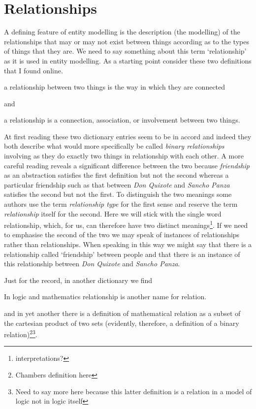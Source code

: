 
\section{Relationships}
\label{Relationships}
\mynote
A defining feature of entity modelling is the description
 (the modelling) of the relationships that may or may not  exist between things according as to the types of things that they are. 
\mynote 
We need to say something about this term `relationship' as it is used in
entity modelling.
As a starting point consider these two definitions that I found online. 

\begin{erquote}
a relationship between two things is the way in which they are connected
\end{erquote}
and 
\begin{erquote}
a relationship is a connection, association, or involvement between two things.
\end{erquote}

At first reading these two dictionary entries seem to be in accord and indeed 
they both describe what would more specifically be called \textit{binary relationships} involving as they do exactly two things in relationship with each other.
A more careful reading reveals a significant difference between the two because \textit{friendship} as an abstraction satisfies the first definition but not the second whereas a particular friendship such as that between \textit{Don Quixote} and \textit{Sancho Panza} satisfies the second  but not the first. 
To distinguish the two meanings some authors use the term \textit{relationship type} for the first sense and reserve the term \textit{relationship} itself for the second. Here we will stick with the single word relationship, which, for us, can therefore have two distinct meanings\footnote{interpretations?}. If we need to emphasise the second of the two we may speak of instances of relationships rather than relationships. When speaking in this way we might say that there is a relationship called `friendship' between people and that there is an instance of this relationship between \textit{Don Quixote} and \textit{Sancho Panza}.

\mynote
Just for the record, in another dictionary we find 
\begin{erquote}
In logic and mathematics relationship is another name for relation.
\end{erquote}
and in yet another there is a definition of mathematical relation as a subset of the cartesian product of two sets 
(evidently, therefore, a definition of a binary relation)\footnote{Chambers definition here}\footnote{Need to say more here because this latter definition is a relation in a model of logic not in logic itself}. 

